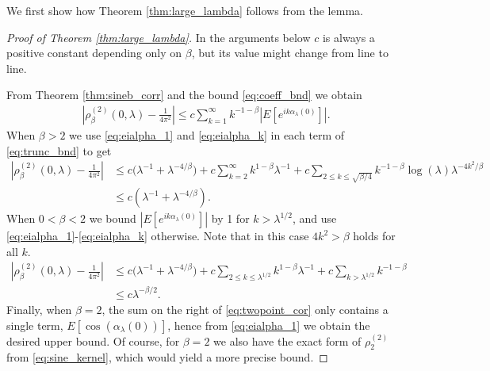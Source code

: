 \documentclass[12pt]{article}
\theoremstyle{definition} %
\theoremstyle{remark} %
\begin{document}
We first show how Theorem \ref{thm:large_lambda} follows from the lemma.
\begin{proof}[Proof of Theorem \ref{thm:large_lambda}]
In the arguments below $c$ is always a positive constant depending only on $\beta$, but its value might change from line to line. 

From Theorem \ref{thm:sineb_corr} and the bound \eqref{eq:coeff_bnd} we obtain
\begin{align}\label{eq:trunc_bnd}
    \left| \rho_\beta^{(2)}(0,\lambda)-\frac{1}{4\pi^2}\right|\le c\sum_{k=1}^\infty  k^{-1-\beta} \left|E[e^{i k \alpha_\lambda(0)}]\right|.
\end{align}
When $\beta > 2$ we use \eqref{eq:eialpha_1} and \eqref{eq:eialpha_k} in each term of \eqref{eq:trunc_bnd} to get
\begin{align*}
    \left| \rho_\beta^{(2)}(0,\lambda)-\frac{1}{4\pi^2}\right|
    &\leq c \big(\lambda^{-1}+\lambda^{-4/\beta}\big)
      + c \sum_{k=2}^\infty  k^{1-\beta} \lambda^{-1}+c \!\!\sum_{2\le k\le \sqrt{\beta/4}} k^{-1-\beta}\log(\lambda) \lambda^{-4k^2/\beta}\\
&\le c(\lambda^{-1}+\lambda^{-4/\beta}).
\end{align*}
When $0 < \beta < 2$ we bound $\left|E[e^{i k \alpha_\lambda(0)}]\right|$ by 1 for $k>\lambda^{1/2}$, and use \eqref{eq:eialpha_1}-\eqref{eq:eialpha_k} otherwise. Note that in this case $4k^2>\beta$ holds for all $k$.
\begin{align*}
    \left| \rho_\beta^{(2)}(0,\lambda)-\frac{1}{4\pi^2}\right|
     &\le c\big(\lambda^{-1}+\lambda^{-4/\beta}\big)
      + c\sum_{2\le k\le \lambda^{1/2}}
  k^{1-\beta} \lambda^{-1}+ c \sum_{k> \lambda^{1/2}} k^{-1-\beta}\\
    &\le c \lambda^{-\beta/2}.
\end{align*}
Finally, when $\beta=2$, the sum on the right of \eqref{eq:twopoint_cor} only contains a single term, $E[\cos(\alpha_\lambda(0))]$, hence from \eqref{eq:eialpha_1} we obtain the desired upper bound. Of course, for $\beta=2$ we also have the exact form of $\rho_2^{(2)}$ from \eqref{eq:sine_kernel}, which would yield a more precise bound.
\end{proof}
\end{document}
